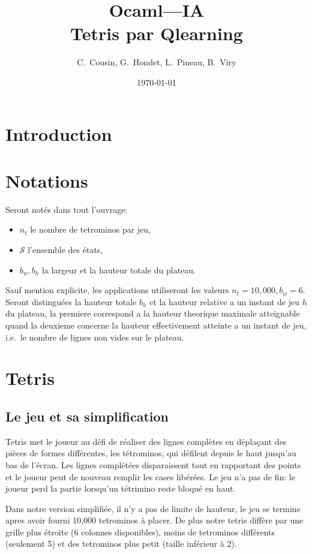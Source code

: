 \documentclass{article}
\title{Ocaml---IA\\Tetris par Qlearning}
\author{C.~Cousin, G.~Hondet, L.~Pineau, B.~Viry}
\date{\today}
\begin{document}
\maketitle
\tableofcontents

\section*{Introduction}

\section*{Notations}
Seront not\'es dans tout l'ouvrage:
\begin{itemize}
  \item \(n_t\) le nombre de tetrominos par jeu,
  \item \(\mathcal{S}\) l'ensemble des \'etats,
  \item \(b_w, b_h\) la largeur et la hauteur totale du plateau.
\end{itemize}
Sauf mention explicite, les applications utiliseront les valeurs \(n_t=10,000,
b_w = 6\). Seront distingu\'ees la hauteur totale \(b_h\) et la hauteur relative
a un instant de jeu \(h\) du plateau, la premiere correspond a la hauteur
theorique maximale atteignable quand la deuxieme concerne la hauteur
effectivement atteinte a un instant de jeu, i.e.\ le nombre de lignes non vides
sur le plateau.

\section{Tetris}

\subsection{Le jeu et sa simplification}
Tetris met le joueur au défi de réaliser des lignes complètes en déplaçant des
pièces de formes différentes, les tétrominos, qui défilent depuis le haut
jusqu'au bas de l'écran. Les lignes complétées disparaissent tout en rapportant
des points et le joueur peut de nouveau remplir les cases libérées. Le jeu
n'a pas de fin: le joueur perd la partie lorsqu'un tétrimino reste bloqué en
haut.

Dans notre version simplifiée, il n'y a pas de limite de hauteur, le jeu se
termine apres avoir fourni 10,000 tetrominos à placer. De plus notre
tetris diffère par une grille plus étroite (6 colonnes disponibles), moins de
tetrominos différents (seulement 5) et des tetrominos plus petit (taille
inférieur à 2).
\end{document}
